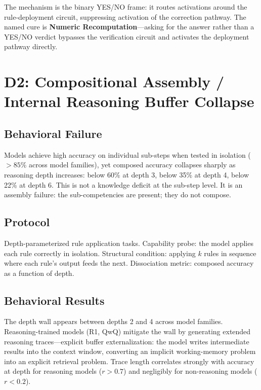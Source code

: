\documentclass[11pt]{article}
\newcommand{\Irb}{Internal Reasoning Buffer}
\begin{document}
The mechanism is the binary YES/NO frame: it routes activations around
the rule-deployment circuit, suppressing activation of the correction
pathway. The named cure is \textbf{Numeric Recomputation}---asking for
the answer rather than a YES/NO verdict bypasses the verification circuit
and activates the deployment pathway directly.

\section{D2: Compositional Assembly / \Irb{} Collapse}
\label{sec:d2}

\subsection{Behavioral Failure}

Models achieve high accuracy on individual sub-steps when tested in
isolation ($>85$\% across model families), yet composed accuracy
collapses sharply as reasoning depth increases: below 60\% at depth 3,
below 35\% at depth 4, below 22\% at depth 6. This is not a knowledge
deficit at the sub-step level. It is an assembly failure: the
sub-competencies are present; they do not compose.

\subsection{Protocol}

Depth-parameterized rule application tasks. Capability probe: the model
applies each rule correctly in isolation. Structural condition: applying
$k$ rules in sequence where each rule's output feeds the next.
Dissociation metric: composed accuracy as a function of depth.

\subsection{Behavioral Results}

The depth wall appears between depths 2 and 4 across model families.
Reasoning-trained models (R1, QwQ) mitigate the wall by generating
extended reasoning traces---explicit buffer externalization: the model
writes intermediate results into the context window, converting an
implicit working-memory problem into an explicit retrieval problem. Trace
length correlates strongly with accuracy at depth for reasoning models
($r > 0.7$) and negligibly for non-reasoning models ($r < 0.2$).
\end{document}
